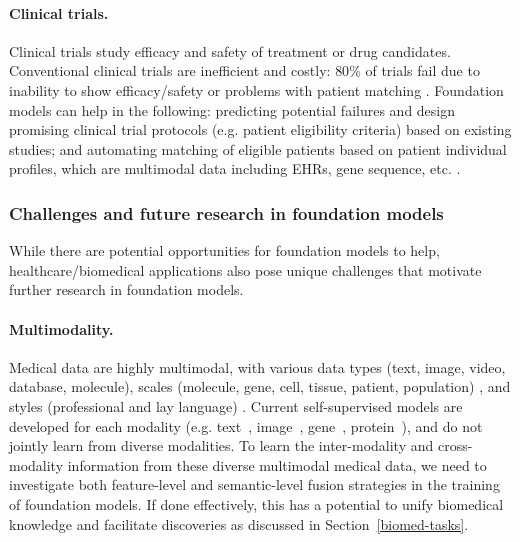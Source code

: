\paragraph{Clinical trials.} Clinical trials study efficacy and safety of treatment or drug candidates. Conventional clinical trials are inefficient and costly: $80$\% of trials fail due to inability to show efficacy/safety or problems with patient matching \citep{ali2020virtual,liu2021evaluating}. Foundation models can help in the following: predicting potential failures and design promising clinical trial protocols (e.g. patient eligibility criteria) based on existing studies; and automating matching of eligible patients based on patient individual profiles, which are multimodal data including EHRs, gene sequence, etc. \citep{harrer2019artificial}.

\subsubsection{Challenges and future research in foundation models}
\label{sec:healthcare-biomed-challenge}

While there are potential opportunities for foundation models to help, healthcare/biomedical applications also pose unique challenges that motivate further research in foundation models. 

\paragraph{Multimodality.}
Medical data are highly multimodal, with various data types (text, image, video, database, molecule), scales (molecule, gene, cell, tissue, patient, population) \citep{kong2011integrative,ruiz2020identification}, and styles (professional and lay language) \citep{lavertu2019redmed,li2019neural}. Current self-supervised models are developed for each modality (e.g. text~\citep{lee2020biobert}, image~\citep{chaitanya2020contrastive}, gene~\citep{ji2021dnabert}, protein~\citep{jumper2020high}), and do not jointly learn from diverse modalities. To learn the inter-modality and cross-modality information  from these diverse multimodal medical data, we need to investigate both feature-level and semantic-level fusion strategies in the training of foundation models. If done effectively, this has a potential to unify biomedical knowledge and facilitate discoveries as discussed in Section~\ref{biomed-tasks}.

